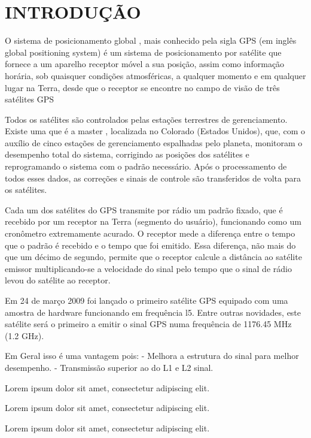 
\chapter{INTRODUÇÃO}

O sistema de posicionamento global %
, mais conhecido pela sigla GPS (em inglês global positioning system) %
é um sistema de posicionamento por satélite que fornece a um aparelho receptor móvel a sua posição, assim como informação horária,
sob quaisquer condições atmosféricas, a qualquer momento e em qualquer lugar na Terra, desde que
o receptor se encontre no campo de visão de três satélites GPS

Todos os satélites são controlados pelas estações terrestres de
gerenciamento. Existe uma que é a master %
, localizada no Colorado (Estados Unidos), que, com o auxílio de cinco estações de gerenciamento
espalhadas pelo planeta, monitoram o desempenho total do sistema, corrigindo
as posições dos satélites e reprogramando o sistema com o padrão
necessário. Após o processamento de todos esses dados, as correções e
sinais de controle são transferidos de volta para os satélites.

Cada um dos satélites do GPS %
transmite por rádio um padrão fixado,
que é recebido por um receptor na Terra (segmento do usuário), funcionando
como um cronômetro extremamente acurado. O receptor mede a diferença
entre o tempo que o padrão é recebido e o tempo que foi emitido. Essa
diferença, não mais do que um décimo de segundo, permite que o receptor
calcule a distância ao satélite emissor multiplicando-se a 
velocidade do sinal %
pelo tempo que o sinal de rádio levou do satélite ao receptor.

Em 24 de março 2009 foi lançado o primeiro satélite GPS equipado com uma amostra de hardware funcionando em frequência l5.
Entre outras novidades, este satélite será o primeiro a emitir o sinal GPS numa frequência de 1176.45 MHz (1.2 GHz).

Em Geral isso é uma vantagem pois:
- Melhora a estrutura do sinal para melhor desempenho.
- Transmissão superior ao do L1 e L2 sinal.

Lorem ipsum dolor sit amet, consectetur adipiscing elit.

Lorem ipsum dolor sit amet, consectetur adipiscing elit.

Lorem ipsum dolor sit amet, consectetur adipiscing elit.